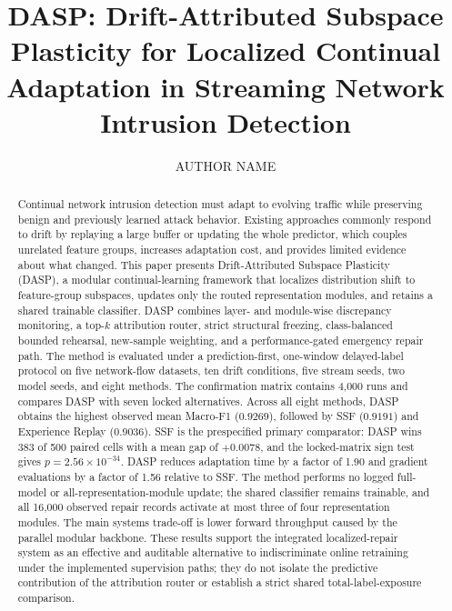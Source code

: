 \documentclass{ieeeaccess}
\begin{document}

\title{DASP: Drift-Attributed Subspace Plasticity for Localized Continual Adaptation in Streaming Network Intrusion Detection}

\author{\uppercase{Author Name}}
\address[1]{Affiliation to be completed before submission (e-mail: corresponding author e-mail to be completed).}

\begin{abstract}
Continual network intrusion detection must adapt to evolving traffic while preserving benign and previously learned attack behavior. Existing approaches commonly respond to drift by replaying a large buffer or updating the whole predictor, which couples unrelated feature groups, increases adaptation cost, and provides limited evidence about what changed. This paper presents Drift-Attributed Subspace Plasticity (DASP), a modular continual-learning framework that localizes distribution shift to feature-group subspaces, updates only the routed representation modules, and retains a shared trainable classifier. DASP combines layer- and module-wise discrepancy monitoring, a top-$k$ attribution router, strict structural freezing, class-balanced bounded rehearsal, new-sample weighting, and a performance-gated emergency repair path. The method is evaluated under a prediction-first, one-window delayed-label protocol on five network-flow datasets, ten drift conditions, five stream seeds, two model seeds, and eight methods. The confirmation matrix contains 4,000 runs and compares DASP with seven locked alternatives. Across all eight methods, DASP obtains the highest observed mean Macro-F1 ($0.9269$), followed by SSF ($0.9191$) and Experience Replay ($0.9036$). SSF is the prespecified primary comparator: DASP wins 383 of 500 paired cells with a mean gap of $+0.0078$, and the locked-matrix sign test gives $p=2.56\times10^{-34}$. DASP reduces adaptation time by a factor of 1.90 and gradient evaluations by a factor of 1.56 relative to SSF. The method performs no logged full-model or all-representation-module update; the shared classifier remains trainable, and all 16,000 observed repair records activate at most three of four representation modules. The main systems trade-off is lower forward throughput caused by the parallel modular backbone. These results support the integrated localized-repair system as an effective and auditable alternative to indiscriminate online retraining under the implemented supervision paths; they do not isolate the predictive contribution of the attribution router or establish a strict shared total-label-exposure comparison.
\end{abstract}
\end{document}
